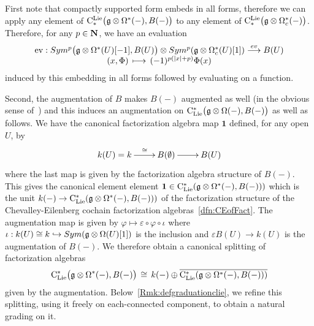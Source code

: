 \documentclass[11pt]{amsart}
\numberwithin{equation}{section}
\begin{document}
\smallskip 

First note that compactly supported form embeds in all forms, therefore we can apply 
any element of ${\rm C}^{\rm Lie}_*\big(\mathfrak g \otimes \Omega^* (-), B(-)\big)$ 
to any element of ${\rm C}^{\rm Lie}_*\big(\mathfrak g \otimes \Omega_c^* (-)\big)$. Therefore, for any  $p\in \mathbf N$, we have an evaluation 
\begin{equation} \label{eqdef:ev} \begin{array}{c}{\rm ev}: Sym^p \big( \mathfrak g \otimes \Omega^* (U)[-1] ,B(U)\big)
\otimes  Sym^p( \mathfrak g\otimes \Omega^*_c(U) [1]) \stackrel{ev}\longrightarrow B(U)  
  \\
 (x,\Phi) \,\longmapsto\, (-1)^{p(|x|+p) } \Phi (x)\end{array}
\end{equation} induced by this embedding  in all forms followed by evaluating on a function.



\smallskip

Second, the augmentation of $B$ makes $B(-)$ augmented as well (in the obvious sense of~\cite{Gi-NotesFactorization}) and this induces an augmentation on
${\rm C}_{\rm Lie}^*\big(\mathfrak g\otimes \Omega (-), B(-) \big)$ as well as follows. 
We have the canonical factorization algebra map  $\mathbf{1}$  defined, for any open $U$, by 
\[\xymatrix{ k(U)=k  \ar[r]^{\quad \cong}& 
B(\emptyset) \ar[r] & B(U)  } 
 \] where the last map is given by the factorization algebra structure of $B(-)$. This gives the canonical element element 
 $\mathbf{1}\in {\rm C}_{\rm Lie}^*(\mathfrak g\otimes \Omega^*(-), B(-)) )$ which is the unit $k(-)\to {\rm C}_{\rm Lie}^*(\mathfrak g\otimes \Omega^*(-), B(-)) )$
 of the factorization structure of 
 the Chevalley-Eilenberg cochain factorization algebras~\ref{dfn:CEofFact}.  
 The augmentation map is given by $\varphi\mapsto \varepsilon \circ \varphi \circ 
 \iota$ where $\iota: k(U) \cong k \hookrightarrow Sym(\mathfrak g \otimes \Omega (U) [1]) $ is the inclusion and $\varepsilon B(U)\to k(U)$ is the augmentation of 
 $B(-)$. We therefore obtain a canonical splitting of factorization algebras 
 \begin{equation}\label{eq:splittingbyaugm}
   {\rm C}_{\rm Lie}^*\big(\mathfrak g\otimes \Omega^*(-), B(-)\big)  \, \cong \, k(-) \oplus \overline{ {\rm C}_{\rm Lie}^*(\mathfrak g\otimes \Omega^*(-), B(-)) )}
 \end{equation}
given by the augmentation. Below~\ref{Rmk:defgraduationclie}, we refine  this splitting, using it  freely  on each-connected component, to obtain 
a natural grading on it.
 
 
\smallskip 
\end{document}

